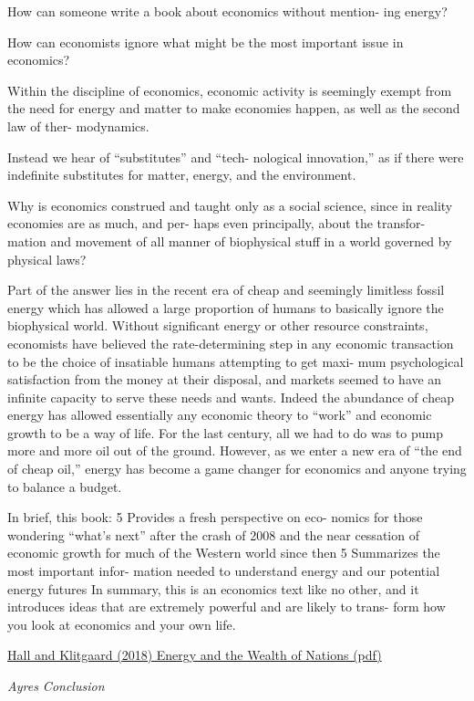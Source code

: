 \documentclass[
]{book}
\begin{document}
How can someone write a
book about economics without mention-
ing energy?

How can economists ignore
what might be the most important issue in
economics?

Within
the discipline of economics, economic
activity is seemingly exempt from the need
for energy and matter to make economies
happen, as well as the second law of ther-
modynamics.

Instead we hear of ``substitutes'' and ``tech-
nological innovation,'' as if there were
indefinite substitutes for matter, energy,
and the environment.

Why is economics construed and
taught only as a social science, since in
reality economies are as much, and per-
haps even principally, about the transfor-
mation and movement of all manner of
biophysical stuff in a world governed by
physical laws?

Part of the answer lies in the recent era of
cheap and seemingly limitless fossil energy
which has allowed a large proportion of
humans to basically ignore the biophysical
world. Without significant energy or other
resource constraints, economists have
believed the rate-determining step in any
economic transaction to be the choice of
insatiable humans attempting to get maxi-
mum psychological satisfaction from the
money at their disposal, and markets
seemed to have an infinite capacity to
serve these needs and wants. Indeed the
abundance of cheap energy has allowed
essentially any economic theory to ``work''
and economic growth to be a way of life.
For the last century, all we had to do was to
pump more and more oil out of the ground.
However, as we enter a new era of ``the end
of cheap oil,''
energy has become a game
changer for economics and anyone trying
to balance a budget.

In brief, this book:
5 Provides a fresh perspective on eco-
nomics for those wondering ``what's
next'' after the crash of 2008 and the
near cessation of economic growth for
much of the Western world since then
5 Summarizes the most important infor-
mation needed to understand energy
and our potential energy futures
In summary, this is an economics text like
no other, and it introduces ideas that are
extremely powerful and are likely to trans-
form how you look at economics and your
own life.

\href{pdf/Hall_Klitgaard_2018_Energy_And_The_Wealth_Of_Nations.pdf}{Hall and Klitgaard (2018) Energy and the Wealth of Nations (pdf)}

\emph{Ayres Conclusion}
\end{document}
